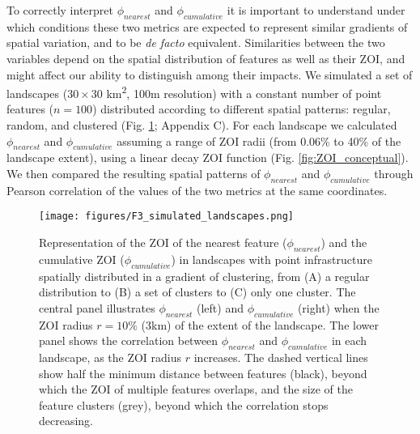 \documentclass[titlepage]{article}
\begin{document}
To correctly interpret $\phi_{nearest}$ and $\phi_{cumulative}$ it is important to understand under which conditions these two metrics are expected to represent similar gradients of spatial variation, and to be \textit{de facto} equivalent. Similarities between the two variables depend on the spatial distribution of features as well as their ZOI, and might affect our ability to distinguish among their impacts. We simulated a set of landscapes ($30 \times 30$ km\textsuperscript{2}, 100m resolution) with a constant number of point features ($n = 100$) distributed according to different spatial patterns: regular, random, and clustered (Fig. \ref{fig:simulated_landscapes}; Appendix C). For each landscape we calculated $\phi_{nearest}$ and $\phi_{cumulative}$ assuming a range of ZOI radii (from 0.06\% to 40\% of the landscape extent), using a linear decay ZOI function (Fig. \ref{fig:ZOI_conceptual}). We then compared the resulting spatial patterns of $\phi_{nearest}$ and $\phi_{cumulative}$ through Pearson correlation of the values of the two metrics at the same coordinates. 

\begin{figure}[h]
\centering
\texttt{[image: figures/F3\_simulated\_landscapes.png]}
\caption{\label{fig:simulated_landscapes} Representation of the ZOI of the nearest feature ($\phi_{nearest}$) and the cumulative ZOI ($\phi_{cumulative}$) in landscapes with point infrastructure spatially distributed in a gradient of clustering, from (A) a regular distribution to (B) a set of clusters to (C) only one cluster. 
The central panel illustrates $\phi_{nearest}$ (left) and $\phi_{cumulative}$ (right) when the ZOI radius $r = 10\%$ (3km) of the extent of the landscape. The lower panel shows the correlation between $\phi_{nearest}$ and $\phi_{cumulative}$ in each landscape, as the ZOI radius $r$ increases. The dashed vertical lines show half the minimum distance between features (black), beyond which the ZOI of multiple features overlaps, and the size of the feature clusters (grey), beyond which the correlation stops decreasing.}
\end{figure}
\end{document}
